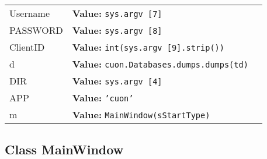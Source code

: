 \begin{longtable}{|p{\varnamewidth}|p{\vardescrwidth}|l}
\cline{1-2}
\raggedright U\-s\-e\-r\-n\-a\-m\-e\- & \raggedright \textbf{Value:} 
{\tt sys.argv [7]}&\\
\cline{1-2}
\raggedright P\-A\-S\-S\-W\-O\-R\-D\- & \raggedright \textbf{Value:} 
{\tt sys.argv [8]}&\\
\cline{1-2}
\raggedright C\-l\-i\-e\-n\-t\-I\-D\- & \raggedright \textbf{Value:} 
{\tt int(sys.argv [9].strip())}&\\
\cline{1-2}
\raggedright d\- & \raggedright \textbf{Value:} 
{\tt cuon.Databases.dumps.dumps(td)}&\\
\cline{1-2}
\raggedright D\-I\-R\- & \raggedright \textbf{Value:} 
{\tt sys.argv [4]}&\\
\cline{1-2}
\raggedright A\-P\-P\- & \raggedright \textbf{Value:} 
{\tt 'cuon'}&\\
\cline{1-2}
\raggedright m\- & \raggedright \textbf{Value:} 
{\tt MainWindow(sStartType)}&\\
\cline{1-2}
\end{longtable}



\subsection{Class MainWindow}

